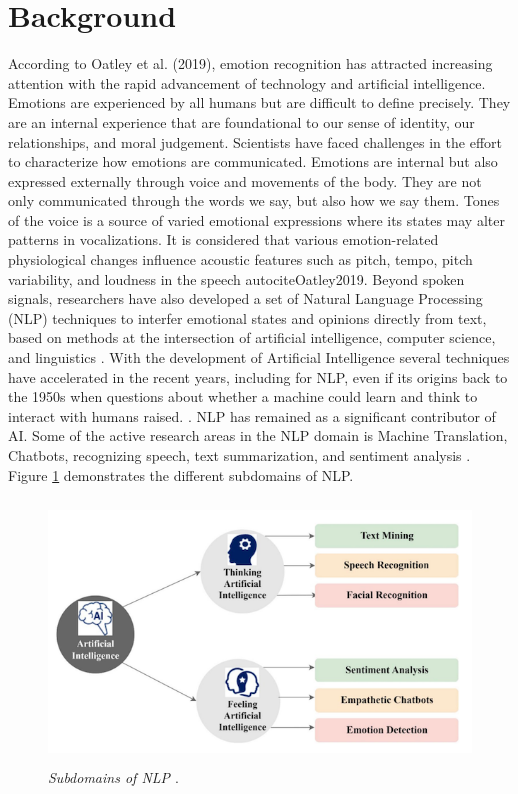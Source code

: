 \section{Background}
According to Oatley et al. (2019), emotion recognition has attracted increasing attention with the rapid advancement of technology and artificial intelligence. Emotions are experienced by all humans but are difficult to define precisely. They are an internal experience that are foundational to our sense of identity, our relationships, and moral judgement. Scientists have faced challenges in the effort to characterize how emotions are communicated. Emotions are internal but also expressed externally through voice and movements of the body. They are not only communicated through the words we say, but also how we say them. Tones of the voice is a source of varied emotional expressions where its states may alter patterns in vocalizations. It is considered that various emotion-related physiological changes influence acoustic features such as pitch, tempo, pitch variability, and loudness in the speech autocite{Oatley2019}. Beyond spoken signals, researchers have also developed a set of Natural Language Processing (NLP) techniques to interfer emotional states and opinions directly from text, based on methods at the intersection of artificial intelligence, computer science, and linguistics \autocite{Kansara2020}.
With the development of Artificial Intelligence several techniques have accelerated in the recent years, including for NLP, even if its origins back to the 1950s when questions about whether a machine could learn and think to interact with humans raised. \autocite{Alvarez2024}. NLP has remained as a significant contributor of AI. Some of the active research areas in the NLP domain is Machine Translation, Chatbots, recognizing speech, text summarization, and sentiment analysis \autocite{Kusal2023}. Figure \ref{fig:subdomains-AI} demonstrates the different subdomains of NLP. 
\begin{figure}[ht]
    \centering
    \includegraphics[height=7cm]{png/subdomains AI.png}
    \caption{\textit{Subdomains of NLP \autocite{Kusal2023}}.}
    \label{fig:subdomains-AI}
\end{figure}


